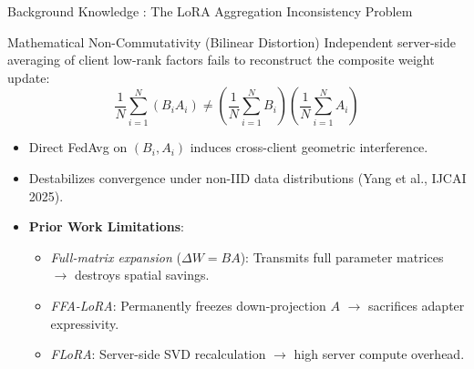 \documentclass[aspectratio=169]{beamer}
\begin{document}
\begin{frame}{Background Knowledge : The LoRA Aggregation Inconsistency Problem}
    \begin{alertblock}{Mathematical Non-Commutativity (Bilinear Distortion)}
        Independent server-side averaging of client low-rank factors fails to reconstruct the composite weight update:
        $$\frac{1}{N}\sum_{i=1}^{N} (B_i A_i) \neq \left(\frac{1}{N}\sum_{i=1}^{N} B_i\right) \left(\frac{1}{N}\sum_{i=1}^{N} A_i\right)$$
    \end{alertblock}
    
    \begin{itemize}
        \item Direct FedAvg on $(B_i, A_i)$ induces cross-client geometric interference.
        \item Destabilizes convergence under non-IID data distributions (Yang et al., IJCAI 2025).
        \item \textbf{Prior Work Limitations}:
        \begin{itemize}
            \item \emph{Full-matrix expansion} ($\Delta W = BA$): Transmits full parameter matrices $\to$ destroys spatial savings.
            \item \emph{FFA-LoRA}: Permanently freezes down-projection $A$ $\to$ sacrifices adapter expressivity.
            \item \emph{FLoRA}: Server-side SVD recalculation $\to$ high server compute overhead.
        \end{itemize}
    \end{itemize}
\end{frame}
\end{document}
